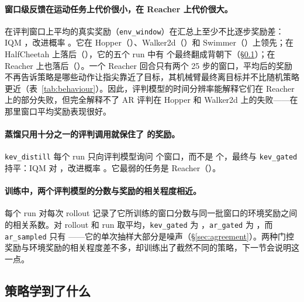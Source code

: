 \paragraph{窗口级反馈在运动任务上代价很小，在 Reacher 上代价很大。} 在评判窗口上平均的真实奖励（\texttt{env\_window}）在汇总上至少不比逐步奖励差：IQM  ，改进概率 。它在 Hopper（）、Walker2d（）和 Swimmer（）上领先；在 HalfCheetah 上落后（），它的五个 run 中有  个最终翻成背朝下（\S\ref{sec:behaviour}）；在 Reacher 上也落后（）。一个 Reacher 回合只有两个 25 步的窗口，平均后的奖励不再告诉策略是哪些动作让指尖靠近了目标，其机械臂最终离目标并不比随机策略更近（表~\ref{tab:behaviour}）。因此，评判模型的时间分辨率能解释它们在 Reacher 上的部分失败，但完全解释不了 AR 评判在 Hopper 和 Walker2d 上的失败——在那里窗口平均奖励表现很好。

\paragraph{蒸馏只用十分之一的评判调用就保住了 \kev{} 的奖励。} \texttt{kev\_distill} 每个 run 只向评判模型询问  个窗口，而不是  个，最终与 \texttt{kev\_gated} 持平：IQM  对 ，改进概率 。它最弱的任务是 Reacher（）。

\paragraph{训练中，两个评判模型的分数与奖励的相关程度相近。} 每个 run 对每次 rollout 记录了它所训练的窗口分数与同一批窗口的环境奖励之间的相关系数。对 rollout 和 run 取平均，\texttt{kev\_gated} 为 ，\texttt{ar\_gated} 为 ，而 \texttt{ar\_sampled} 只有 ——它的单次抽样大部分是噪声（\S\ref{sec:agreement}）。两种门控奖励与环境奖励的相关程度差不多，却训练出了截然不同的策略，下一节会说明这一点。

\subsection{策略学到了什么}\label{sec:behaviour}


